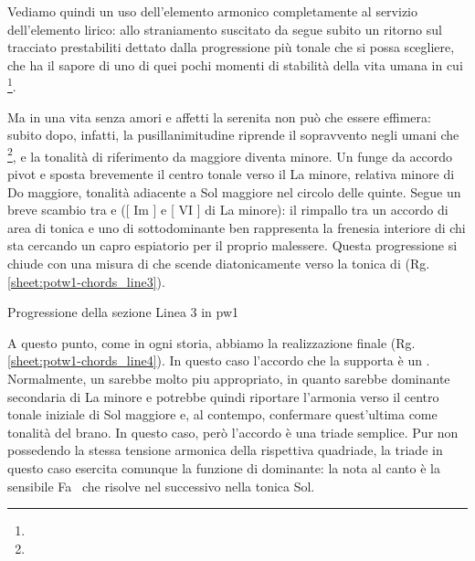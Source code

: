 \documentclass[class=book, crop=false, oneside, 12pt]{standalone}
\begin{document}
    Vediamo quindi un uso dell'elemento armonico completamente al servizio dell'elemento lirico: allo straniamento suscitato da  segue subito un ritorno sul tracciato prestabiliti dettato dalla progressione più tonale che si possa scegliere, che ha il sapore di uno di quei pochi momenti di stabilità della vita umana in cui  \footnote{}.

    Ma in una vita senza amori e affetti la serenita non può che essere effimera: subito dopo, infatti, la pusillanimitudine riprende il sopravvento negli umani che \footnote{}, e la tonalità di riferimento da maggiore diventa minore. Un  funge da accordo pivot e sposta brevemente il centro tonale verso il La minore, relativa minore di Do maggiore, tonalità adiacente a Sol maggiore nel circolo delle quinte. Segue un breve scambio tra  e  ([ Im ] e [ \flat VI ] di La minore): il rimpallo tra un accordo di area di tonica e uno di sottodominante ben rappresenta la frenesia interiore di chi sta cercando un capro espiatorio per il proprio malessere. Questa progressione si chiude con una misura di  che scende diatonicamente verso la tonica di  (Rg.\ref{sheet:potw1-chords_line3}).

    \begin{sheet}[htbp]
        \centering
        \caption{Progressione della sezione Linea 3 in \acrshort{pw1}}
        \label{sheet:potw1-chords_line3}
    \end{sheet}

    A questo punto, come in ogni storia, abbiamo la realizzazione finale (Rg.\ref{sheet:potw1-chords_line4}). In questo caso l'accordo che la supporta è un . Normalmente, un  sarebbe molto piu appropriato, in quanto sarebbe dominante secondaria di La minore e potrebbe quindi riportare l'armonia verso il centro tonale iniziale di Sol maggiore e, al contempo, confermare quest'ultima come tonalità del brano. In questo caso, però l'accordo è una triade semplice. Pur non possedendo la stessa tensione armonica della rispettiva quadriade, la triade in questo caso esercita comunque la funzione di dominante: la nota al canto è la sensibile Fa\sharp~ che risolve nel successivo  nella tonica Sol. 
    
\end{document}
